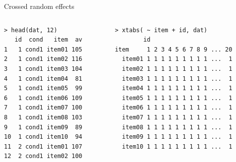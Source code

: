 \documentclass[aspectratio=169]{beamer}
\begin{document}
\begin{frame}[fragile]{Crossed random effects}
  \vspace{-.6cm}
  \begin{columns}
    \begin{column}[t]{4.5cm}
  \begin{lstlisting}
> head(dat, 12)
   id  cond   item  av
1   1 cond1 item01 105
2   1 cond1 item02 116
3   1 cond1 item03 104
4   1 cond1 item04  81
5   1 cond1 item05  99
6   1 cond1 item06 109
7   1 cond1 item07 100
8   1 cond1 item08 103
9   1 cond1 item09  89
10  1 cond1 item10  94
11  2 cond1 item01 107
12  2 cond1 item02 100
  \end{lstlisting}
    \end{column}

    \begin{column}[t]{7cm}
  \begin{lstlisting}
> xtabs( ~ item + id, dat)
        id
item     1 2 3 4 5 6 7 8 9 ... 20
  item01 1 1 1 1 1 1 1 1 1 ...  1
  item02 1 1 1 1 1 1 1 1 1 ...  1
  item03 1 1 1 1 1 1 1 1 1 ...  1
  item04 1 1 1 1 1 1 1 1 1 ...  1
  item05 1 1 1 1 1 1 1 1 1 ...  1
  item06 1 1 1 1 1 1 1 1 1 ...  1
  item07 1 1 1 1 1 1 1 1 1 ...  1
  item08 1 1 1 1 1 1 1 1 1 ...  1
  item09 1 1 1 1 1 1 1 1 1 ...  1
  item10 1 1 1 1 1 1 1 1 1 ...  1
  \end{lstlisting}
    \end{column}
  \end{columns}
\end{frame}
\end{document}
